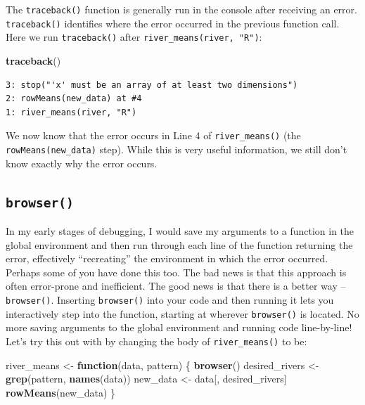 \documentclass[
]{book}
\newenvironment{Shaded}{\begin{snugshade}}{\end{snugshade}}
\newcommand{\ControlFlowTok}[1]{\textcolor[rgb]{0.13,0.29,0.53}{\textbf{#1}}}
\newcommand{\KeywordTok}[1]{\textcolor[rgb]{0.13,0.29,0.53}{\textbf{#1}}}
\newcommand{\NormalTok}[1]{#1}
\newcommand{\StringTok}[1]{\textcolor[rgb]{0.31,0.60,0.02}{#1}}
\begin{document}
The \texttt{traceback()} function is generally run in the console after receiving an error. \texttt{traceback()} identifies where the error occurred in the previous function call. Here we run \texttt{traceback()} after \texttt{river\_means(river,\ "R")}:

\begin{Shaded}
\begin{Highlighting}[]
\KeywordTok{traceback}\NormalTok{()}
\end{Highlighting}
\end{Shaded}

\begin{verbatim}
3: stop("'x' must be an array of at least two dimensions")
2: rowMeans(new_data) at #4
1: river_means(river, "R")
\end{verbatim}

We now know that the error occurs in Line 4 of \texttt{river\_means()} (the \texttt{rowMeans(new\_data)} step). While this is very useful information, we still don't know exactly why the error occurs.

\hypertarget{browser}{%
\subsection{\texorpdfstring{\texttt{browser()}}{browser()}}\label{browser}}

In my early stages of debugging, I would save my arguments to a function in the global environment and then run through each line of the function returning the error, effectively ``recreating'' the environment in which the error occurred. Perhaps some of you have done this too. The bad news is that this approach is often error-prone and inefficient. The good news is that there is a better way -- \texttt{browser()}. Inserting \texttt{browser()} into your code and then running it lets you interactively step into the function, starting at wherever \texttt{browser()} is located. No more saving arguments to the global environment and running code line-by-line! Let's try this out with by changing the body of \texttt{river\_means()} to be:

\begin{Shaded}
\begin{Highlighting}[]
\NormalTok{river_means <-}\StringTok{ }\ControlFlowTok{function}\NormalTok{(data, pattern) \{}
  \KeywordTok{browser}\NormalTok{()}
\NormalTok{  desired_rivers <-}\StringTok{ }\KeywordTok{grep}\NormalTok{(pattern, }\KeywordTok{names}\NormalTok{(data))}
\NormalTok{  new_data <-}\StringTok{ }\NormalTok{data[, desired_rivers]}
  \KeywordTok{rowMeans}\NormalTok{(new_data)}
\NormalTok{\}}
\end{Highlighting}
\end{Shaded}
\end{document}
